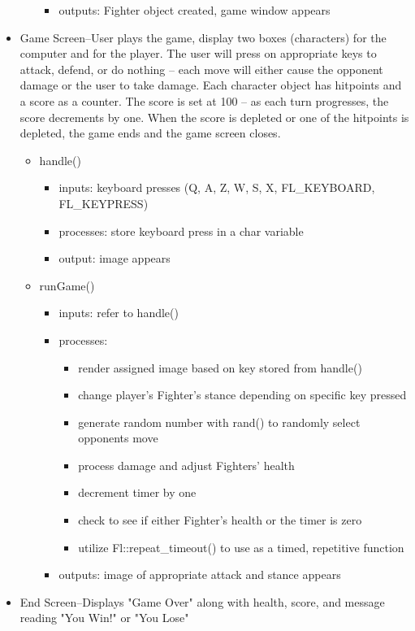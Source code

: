 \documentclass{article}
\begin{document}
\begin{itemize}
\begin{itemize}
\begin{itemize}
\item outputs: Fighter object created, game window appears
\end{itemize}
\end{itemize}
\item Game Screen--User plays the game, display two boxes (characters) for the computer and for the player. The user will press on appropriate keys to attack, defend, or do nothing -- each move will either cause the opponent damage or the user to take damage. Each character object has hitpoints and a score as a counter. The score is set at 100 -- as each turn progresses, the score decrements by one. When the score is depleted or one of the hitpoints is depleted, the game ends and the game screen closes.
\begin{itemize}
\item handle()
\begin{itemize}
\item inputs: keyboard presses (Q, A, Z, W, S, X, FL\_KEYBOARD, FL\_KEYPRESS) 
\item processes: store keyboard press in a char variable
\item output: image appears
\end{itemize}
\item runGame()
\begin{itemize}
\item inputs: refer to handle()
\item processes:
\begin{itemize}
\item render assigned image based on key stored from handle()
\item change player's Fighter's stance depending on specific key pressed
\item generate random number with rand() to randomly select opponent\PrOC{}\PrIA{}\PrJJ{}s move
\item process damage and adjust Fighters' health
\item decrement timer by one
\item check to see if either Fighter's health or the timer is zero
\item utilize Fl::repeat\_timeout() to use as a timed, repetitive function
\end{itemize}
\item outputs: image of appropriate attack and stance appears
\end{itemize}
\end{itemize}
\item End Screen--Displays "Game Over" along with health, score, and message reading "You Win!" or "You Lose"

\end{itemize}
\end{document}
